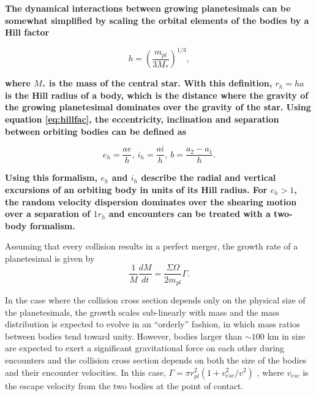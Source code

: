 \documentclass[twocolumn,linenumbers]{aastex63}
\begin{document}
\textbf{The dynamical interactions between growing planetesimals can be somewhat simplified by scaling the orbital elements of the bodies by
a Hill factor}

\begin{equation}\label{eq:hillfac}
	h = \left(\frac{m_{pl}}{3 M_{*}}\right)^{1/3}, 
\end{equation}

\textbf{\noindent where $M_{*}$ is the mass of the central star. With this definition, $r_{h} = h a$ is the Hill radius of a body, which is the distance where the gravity of the growing planetesimal dominates over the gravity of the star. Using equation \ref{eq:hillfac}, the eccentricity, inclination and separation between orbiting bodies can be defined as}

\begin{equation}\label{eq:hillorb}
	e_{h} = \frac{a e}{h}, \: i_{h} = \frac{a i}{h}, \: b = \frac{a_{2} - a_{1}}{h}.
\end{equation}

\textbf{Using this formalism, $e_{h}$ and $i_{h}$ describe the radial and vertical excursions of an orbiting body in units of its Hill radius. For $e_{h} > 1$, the random velocity dispersion dominates over the shearing motion over a separation of $1 r_{h}$ and encounters can be treated with a two-body formalism.}

Assuming that every collision results in a perfect merger, the growth rate of a planetesimal is given by
\begin{equation}\label{eq:growth}
	\frac{1}{M}\frac{dM}{dt} = \frac{\Sigma \Omega}{2 m_{pl}} \Gamma.
\end{equation}

In the case where the collision cross section depends only
on the physical size of the planetesimals, the growth scales sub-linearly
with mass and the mass distribution is expected to evolve in an
``orderly'' fashion, in which mass ratios between bodies tend toward unity. However, bodies larger than $\sim 100$ km in size are expected to exert a significant gravitational force on each other during encounters and the collision cross section depends on both the size of the bodies and their encounter velocities. In this case, $\Gamma = \pi r_{pl}^2 \left( 1 + v_{esc}^2 / v^2 \right)$ \citep{safronov69}, where $v_{esc}$ is the escape velocity from the two bodies at the point of contact.
\end{document}
